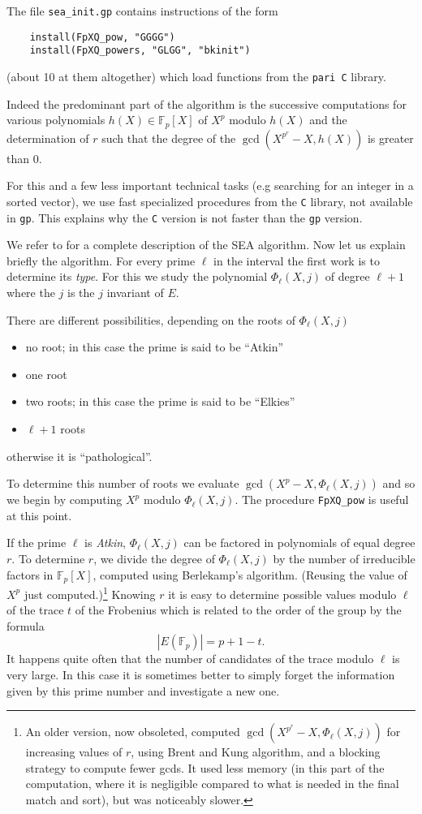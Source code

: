 \documentclass[11pt]{article}
\begin{document}
The file {\tt sea\_init.gp} contains instructions of the form
\begin{verbatim}
    install(FpXQ_pow, "GGGG")
    install(FpXQ_powers, "GLGG", "bkinit")
\end{verbatim}
(about 10 at them altogether) which load functions from the {\tt pari C}
library.

Indeed the predominant part of the algorithm is the successive computations for
various  polynomials $h(X)\in \mathbb{F}_p[X]$ of $X^p$ modulo $h(X)$ and the
determination of $r$ such that the degree of the $\gcd (X^{p^r} - X, h(X))$ is
greater than $0$.

For this and a few less important technical tasks (e.g searching for an integer
in a sorted vector), we use fast specialized procedures from the {\tt C}
library, not available in {\tt gp}. This explains why the {\tt C} version
is not faster than the {\tt gp} version.

We refer to \cite{ler97} for a complete description of the SEA algorithm. Now
let us explain briefly the algorithm. For every prime $\ell$ in the interval
the first work is to determine its \emph{type}. For this we study the
polynomial $\Phi_\ell(X, j)$ of degree $\ell + 1$ where the  $j$ is the $j$
invariant of $E$.

There are different possibilities, depending on the roots of $\Phi_\ell(X,j)$
\begin{itemize}
\item  no root; in this case the prime is said to be ``Atkin''
\item  one root
\item  two roots; in this case the prime is said to be ``Elkies''
\item  $\ell + 1$ roots
\end{itemize}
otherwise it is ``pathological''.

To determine this number of roots we evaluate $\gcd(X^p- X, \Phi_\ell(X, j))$
and so we begin by computing $X^p$ modulo $\Phi_\ell(X, j)$. The procedure
{\tt FpXQ\_pow} is useful at this point.

If the prime $\ell$ is \emph{Atkin}, $\Phi_\ell(X, j)$ can be factored in
polynomials of equal degree $r$. To determine $r$, we divide the degree
of $\Phi_\ell(X,j)$ by the number of irreducible factors in
$\mathbb{F}_p[X]$, computed using Berlekamp's algorithm. (Reusing the value
of $X^p$ just computed.)\footnote{An older version, now obsoleted,
computed $\gcd (X^{p^r}-X, \Phi_\ell(X,j))$ for increasing values of $r$,
using Brent and Kung algorithm, and a blocking strategy to compute fewer gcds.
It used less memory (in this part of the computation, where it is negligible
compared to what is needed in the final match and sort), but was noticeably
slower.}
Knowing $r$ it is easy to determine possible values modulo $\ell$ of the
trace $t$ of the Frobenius which is related to the order of the group by the
formula
$$|E(\mathbb{F}_p)| = p+1-t.$$
It happens quite often that the number of candidates of the trace modulo
$\ell$ is very large. In this case it is sometimes better to simply forget
the information given by this prime number and investigate a new one.
\end{document}
